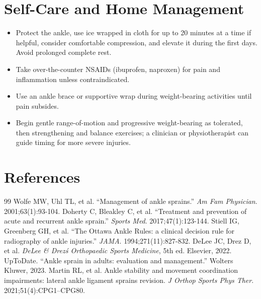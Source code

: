 \section*{Self-Care and Home Management}
\begin{itemize}
 \item Protect the ankle, use ice wrapped in cloth for up to 20 minutes at a time if helpful, consider comfortable compression, and elevate it during the first days. Avoid prolonged complete rest.
 \item Take over-the-counter NSAIDs (ibuprofen, naproxen) for pain and inflammation unless contraindicated.
 \item Use an ankle brace or supportive wrap during weight-bearing activities until pain subsides.
 \item Begin gentle range-of-motion and progressive weight-bearing as tolerated, then strengthening and balance exercises; a clinician or physiotherapist can guide timing for more severe injuries.
\end{itemize}

\section*{References}
\begin{thebibliography}{99}
 Wolfe MW, Uhl TL, et al. ``Management of ankle sprains.'' \textit{Am Fam Physician}. 2001;63(1):93-104.
 Doherty C, Bleakley C, et al. ``Treatment and prevention of acute and recurrent ankle sprain.'' \textit{Sports Med}. 2017;47(1):123-144.
 Stiell IG, Greenberg GH, et al. ``The Ottawa Ankle Rules: a clinical decision rule for radiography of ankle injuries.'' \textit{JAMA}. 1994;271(11):827-832.
 DeLee JC, Drez D, et al. \textit{DeLee \& Drez\'s Orthopaedic Sports Medicine}, 5th ed. Elsevier, 2022.
 UpToDate. ``Ankle sprain in adults: evaluation and management.'' Wolters Kluwer, 2023.
 Martin RL, et al. Ankle stability and movement coordination impairments: lateral ankle ligament sprains revision. \textit{J Orthop Sports Phys Ther}. 2021;51(4):CPG1--CPG80.
\end{thebibliography}
